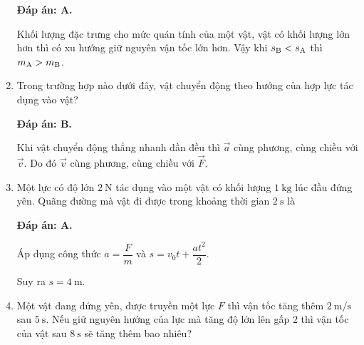 \begin{enumerate}[label=\bfseries Câu \arabic*:]
	\hideall
	{	\textbf{Đáp án: A.}
		
		Khối lượng đặc trưng cho mức quán tính của một vật, vật có khối lượng lớn hơn thì có xu hướng giữ nguyên vận tốc lớn hơn. Vậy khi $s_\text B < s_\text A$ thì $m_\text A > m_\text B$.
	}
	\item {}
	
	
	{Trong trường hợp nào dưới đây, vật chuyển động theo hướng của hợp lực tác dụng vào vật?
	}
	
	\hideall
	{	\textbf{Đáp án: B.}
		
		Khi vật chuyển động thẳng nhanh dần đều thì $\vec a$ cùng phương, cùng chiều với $\vec v$. Do đó $\vec v$ cùng phương, cùng chiều với $\vec F$.
	}
	\item {}
	
	
	{Một lực có độ lớn $\SI{2}{\newton}$ tác dụng vào một vật có khối lượng $\SI{1}{\kilogram}$ lúc đầu đứng yên. Quãng đường mà vật đi được trong khoảng thời gian $\SI{2}{\second}$ là
	}
	
	\hideall
	{	\textbf{Đáp án: A.}
		
		Áp dụng công thức $a=\dfrac{F}{m}$ và $s=v_0t+\dfrac{at^2}{2}$.
		
		Suy ra $s=\SI{4}{\meter}$.
	}
	\item {}
	
	
	{Một vật đang đứng yên, được truyền một lực $F$ thì vận tốc tăng thêm $\SI{2}{\meter / \second}$ sau $\SI{5}{\second}$. Nếu giữ nguyên hướng của lực mà tăng độ lớn lên gấp 2 thì vận tốc của vật sau $\SI{8}{\second}$ sẽ tăng thêm bao nhiêu?
	}
	

\end{enumerate}
